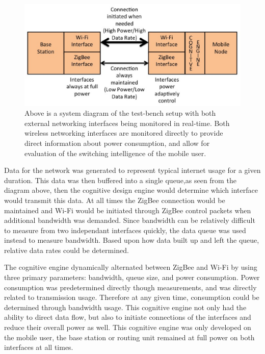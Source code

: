 \documentclass[conference]{IEEEtran}
\begin{document}
\begin{figure}
\begin{center}
\includegraphics[scale=0.35]{system_diagram.eps}
\caption{Above is a system diagram of the test-bench setup with both external networking interfaces being monitored in real-time.  Both wireless networking interfaces are monitored directly to provide direct information about power consumption, and allow for evaluation of the switching intelligence of the mobile user.}
\end{center}
\end{figure}

Data for the network was generated to represent typical internet usage for a given duration.  This data was then buffered into a single queue,as seen from the diagram above, then the cognitive design engine would determine which interface would transmit this data.  At all times the ZigBee connection would be maintained and Wi-Fi would be initiated through ZigBee control packets when additional bandwidth was demanded.  Since bandwidth can be relatively difficult to measure from two independant interfaces quickly, the data queue was used instead to measure bandwidth.  Based upon how data built up and left the queue, relative data rates could be determined.

The cognitive engine dynamically alternated between ZigBee and Wi-Fi by using three primary parameters: bandwidth, queue size, and power consumption.  Power consumption was predetermined directly though measurements, and was directly related to transmission usage.  Therefore at any given time, consumption could be determined through bandwidth usage.  This cognitive engine not only had the ability to direct data flow, but also to initiate connections of the interfaces and reduce their overall power as well.  This cognitive engine was only developed on the mobile user, the base station or routing unit remained at full power on both interfaces at all times.
\end{document}
